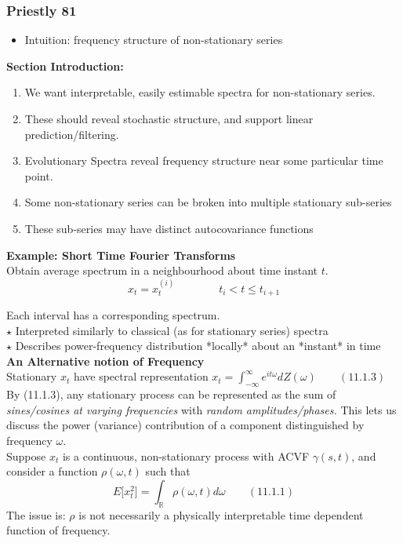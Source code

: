 \documentclass{article}
\begin{document}
{\color{gold}
\subsubsection{Priestly 81}
\begin{itemize}
    \item Intuition: frequency structure of non-stationary series
\end{itemize}
\textbf{Section Introduction: }
\begin{enumerate}
    \item We want interpretable, easily estimable spectra for non-stationary series. 
    \item These should reveal stochastic structure, and support linear prediction/filtering.
    \item Evolutionary Spectra reveal frequency structure near some particular time point.
    \item Some non-stationary series can be broken into multiple stationary sub-series 
    \item These sub-series may have distinct autocovariance functions
\end{enumerate}

\textbf{Example: Short Time Fourier Transforms}\\[8pt]
Obtain average spectrum in a neighbourhood about time instant $t$.
\[x_t = x_t^{(i)} \qquad\qquad t_i < t \leq t_{i+1}\]

Each interval has a corresponding spectrum.\\
$\star$ Interpreted similarly to classical (as for stationary series) spectra \\
$\star$ Describes power-frequency distribution *locally* about an *instant* in time\\

\textbf{An Alternative notion of Frequency}\\[8pt]
Stationary $x_t$ have spectral representation $x_t = \int_{-\infty}^\infty e^{it\omega}dZ(\omega) \qquad (11.1.3)$\\

By (11.1.3), any stationary process can be represented as the sum of 
\textit{sines/cosines at varying frequencies} with \textit{random amplitudes/phases.} 
This lets us discuss the power (variance) contribution of a component distinguished by frequency $\omega$. \\

Suppose $x_t$ is a continuous, non-stationary process with ACVF
$\gamma(s,t)$, and consider a function $\rho(\omega,t)$ such that 
\[E\Big[x^2_t\Big] = \int_{\mathbb{R}} \rho(\omega,t) d\omega \qquad (11.1.1) \]
The issue is: $\rho$ is not necessarily a physically interpretable time dependent function of frequency.\\

}
\end{document}
